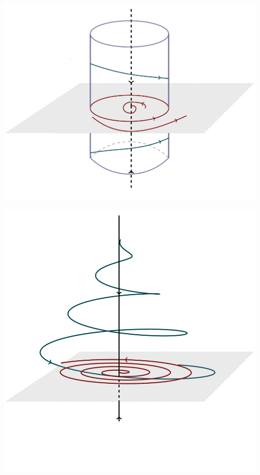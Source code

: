 \begin{center}
    \begin{minipage}{0.32\linewidth}
        \includegraphics[width=\linewidth]{fig/fig61.jpg} 
        \vspace{-50pt}
        \label{fig:1}
    \end{minipage}
\hfill     
    \begin{minipage}{0.3\linewidth}
        \includegraphics[width=\linewidth]{fig/fig60.jpg} 

\end{minipage}
\end{center}
